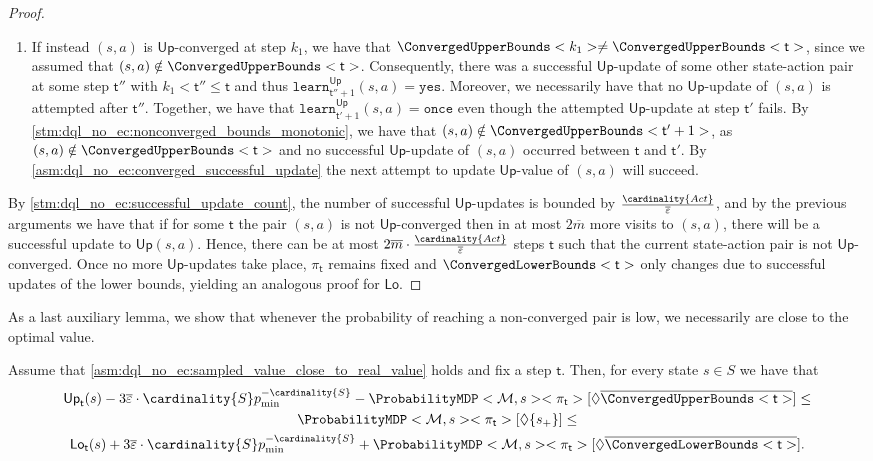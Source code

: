 \documentclass{article}
\newcommand{\MDP}{\mathcal{M}}
\newcommand{\States}{S}
\newcommand{\Actions}{Act}
\newcommand{\strategy}{\pi}
\newcommand{\reach}{\Diamond}
\newcommand{\upperbound}{\mathsf{Up}}
\newcommand{\lowerbound}{\mathsf{Lo}}
\newcommand{\targetstate}{s_+}
\newcommand{\updatestep}{{\overline{\varepsilon}}}
\newcommand{\delay}{{\overline{m}}}
\newcommand{\learn}{\texttt{learn}}
\newcommand{\learnyes}{\texttt{yes}}
\newcommand{\learnonce}{\texttt{once}}
\newcommand{\algostep}{\mathsf{t}}
\begin{document}
\begin{proof}
\begin{enumerate}
\begin{enumerate}
			\item
			If instead $(s, a)$ is $\upperbound$-converged at step $k_1$, we have that $\ConvergedUpperBounds<k_1> \neq \ConvergedUpperBounds<\algostep>$, since we assumed that $(s, a) \notin \ConvergedUpperBounds<\algostep>$.
			Consequently, there was a successful $\upperbound$-update of some other state-action pair at some step $\algostep''$ with $k_1 < \algostep'' \leq \algostep$ and thus $\learn^\upperbound_{\algostep'' + 1}(s, a) = \learnyes$.
			Moreover, we necessarily have that no $\upperbound$-update of $(s, a)$ is attempted after $\algostep''$.
			Together, we have that $\learn^\upperbound_{\algostep' + 1}(s, a) = \learnonce$ even though the attempted $\upperbound$-update at step $\algostep'$ fails.
			By \cref{stm:dql_no_ec:nonconverged_bounds_monotonic}, we have that $(s, a) \notin \ConvergedUpperBounds<\algostep'+1>$, as $(s, a) \notin \ConvergedUpperBounds<\algostep>$ and no successful $\upperbound$-update of $(s, a)$ occurred between $\algostep$ and $\algostep'$.
			By \cref{asm:dql_no_ec:converged_successful_update} the next attempt to update $\upperbound$-value of $(s, a)$ will succeed.
		\end{enumerate}
	\end{enumerate}
	By \cref{stm:dql_no_ec:successful_update_count}, the number of successful $\upperbound$-updates is bounded by $\frac{\cardinality{\Actions}}{\updatestep}$, and by the previous arguments we have that if for some $\algostep$ the pair $(s, a)$ is not $\upperbound$-converged then in at most $2 \delay$ more visits to $(s, a)$, there will be a successful update to $\upperbound(s, a)$.
	Hence, there can be at most $2 \delay \cdot \frac{\cardinality{\Actions}}{\updatestep}$ steps $\algostep$ such that the current state-action pair is not $\upperbound$-converged.
	Once no more $\upperbound$-updates take place, $\strategy_\algostep$ remains fixed and $\ConvergedLowerBounds<\algostep>$ only changes due to successful updates of the lower bounds, yielding an analogous proof for $\lowerbound$. 
\end{proof}
As a last auxiliary lemma, we show that whenever the probability of reaching a non-converged pair is low, we necessarily are close to the optimal value.
\begin{lemma} \label{stm:dql_no_ec:bounds_close}
	Assume that \cref{asm:dql_no_ec:sampled_value_close_to_real_value} holds and fix a step $\algostep$.
	Then, for every state $s \in \States$ we have that
	\begin{gather*}
		\upperbound_\algostep(s) - 3 \updatestep \cdot \cardinality{\States} p_{\min}^{-\cardinality{\States}} - \ProbabilityMDP<\MDP, s><\strategy_\algostep>[\reach \overline{\ConvergedUpperBounds<\algostep>}] \leq \\
		\ProbabilityMDP<\MDP, s><\strategy_\algostep>[\reach \{\targetstate\}] \leq \\
		\lowerbound_\algostep(s) + 3 \updatestep \cdot \cardinality{\States} p_{\min}^{-\cardinality{\States}} + \ProbabilityMDP<\MDP, s><\strategy_\algostep>[\reach \overline{\ConvergedLowerBounds<\algostep>}].
	\end{gather*}
\end{lemma}
\end{document}

